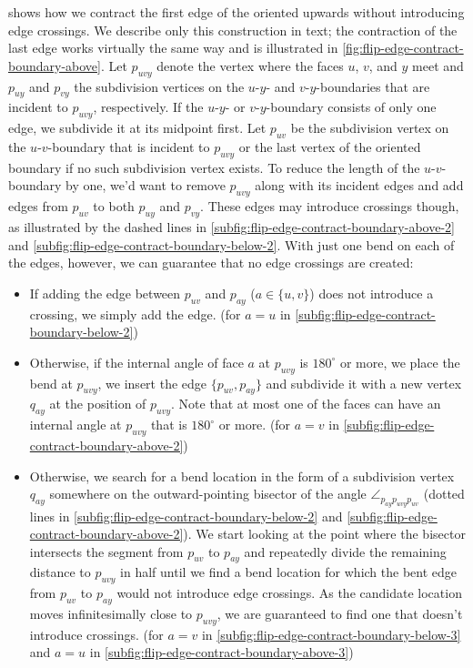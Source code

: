  shows how we contract the first edge of the oriented upwards without introducing edge crossings.
We describe only this construction in text; the contraction of the last edge works virtually the same way and is illustrated in \cref{fig:flip-edge-contract-boundary-above}.
Let $p_{uvy}$ denote the vertex where the faces $u$, $v$, and $y$ meet and $p_{uy}$ and $p_{vy}$ the subdivision vertices on the $u$-$y$- and $v$-$y$-boundaries that are incident to $p_{uvy}$, respectively.
If the $u$-$y$- or $v$-$y$-boundary consists of only one edge, we subdivide it at its midpoint first.
Let $p_{uv}$ be the subdivision vertex on the $u$-$v$-boundary that is incident to $p_{uvy}$ or the last vertex of the oriented boundary if no such subdivision vertex exists.
To reduce the length of the $u$-$v$-boundary by one, we'd want to remove $p_{uvy}$ along with its incident edges and add edges from $p_{uv}$ to both $p_{uy}$ and $p_{vy}$.
These edges may introduce crossings though, as illustrated by the dashed lines in \cref{subfig:flip-edge-contract-boundary-above-2} and \cref{subfig:flip-edge-contract-boundary-below-2}.
With just one bend on each of the edges, however, we can guarantee that no edge crossings are created:

\begin{itemize}
\item If adding the edge between $p_{uv}$ and $p_{ay}$ ($a \in \{u,v\}$) does not introduce a crossing, we simply add the edge.
(for $a = u$ in \cref{subfig:flip-edge-contract-boundary-below-2})
\item Otherwise, if the internal angle of face $a$ at $p_{uvy}$ is $180^\circ$ or more, we place the bend at $p_{uvy}$, \ie{} we insert the edge $\{p_{uv},p_{ay}\}$ and subdivide it with a new vertex $q_{ay}$ at the position of $p_{uvy}$.
Note that at most one of the faces can have an internal angle at $p_{uvy}$ that is $180^\circ$ or more.
(for $a = v$ in \cref{subfig:flip-edge-contract-boundary-above-2})
\item Otherwise, we search for a bend location in the form of a subdivision vertex $q_{ay}$ somewhere on the outward-pointing bisector of the angle $\angle_{p_{ay}p_{uvy}p_{uv}}$ (dotted lines in \cref{subfig:flip-edge-contract-boundary-below-2} and \cref{subfig:flip-edge-contract-boundary-above-2}).
We start looking at the point where the bisector intersects the segment from $p_{uv}$ to $p_{ay}$ and repeatedly divide the remaining distance to $p_{uvy}$ in half until we find a bend location for which the bent edge from $p_{uv}$ to $p_{ay}$ would not introduce edge crossings.
As the candidate location moves infinitesimally close to $p_{uvy}$, we are guaranteed to find one that doesn't introduce crossings.
(for $a = v$ in \cref{subfig:flip-edge-contract-boundary-below-3} and $a = u$ in \cref{subfig:flip-edge-contract-boundary-above-3})
\end{itemize}

